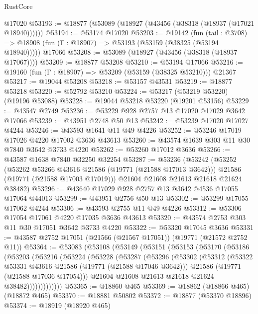 \begin{lexlean}{RustCore}
\begin{coremodule}
    @17020
@53193 := @18877 (@53089 (@18927 (@43456 (@38318 (@18937 (@17021 @18940))))))
@53194 := @53174 @17020
@53203 := @19142
    (fun (tail : @3708) => @18908 (fun (Γ : @18907) => @53193 (@53159 (@38325 (@53194 @18940)))))
    @17066
@53208 := @53089 (@18927 (@43456 (@38318 (@18937 @17067))))
@53209 := @18877 @53208
@53210 := @53194 @17066
@53216 := @19160 (fun (Γ : @18907) => @53209 (@53159 (@38325 @53210))) @21367
@53217 := @19044 @53208
@53218 := @53157 @43531
@53219 := @18877 @53218
@53220 := @52792 @53210
@53224 := @53217 (@53219 @53220) (@19196 @53088)
@53228 := @19044 @53218 @53220 (@19201 @53156)
@53229 := @43547 @2749
@53236 := @53229 @928 @2757 @13 @17020 @17029 @3642 @17066
@53239 := @43951 @2748 @50 @13
@53242 := @53239 @17020 @17027 @4244
@53246 := @43593 @1641 @11 @49 @4226
@53252 := @53246 @17019 @17026 @4220 @17002 @3636 @43613
@53260 := @43574 @1639 @303 @11 @30 @7840 @3642 @3733 @4220
@53262 := @53260 @17012 @3636
@53266 := @43587 @1638 @7840 @32250 @32254
@53287 := @53236
    (@53242
      (@53252
        (@53262 @53266 @43616 @21586 (@19771 (@21588 @17013 @3642)))
        @21586
        (@19771 (@21588 @17003 @17019)))
      @21604
      @21608
      @21613
      @21618
      @21624
      @38482)
@53296 := @43640 @17029 @928 @2757 @13 @3642 @4536 @17055 @17064 @44013
@53299 := @43951 @2756 @50 @13
@53302 := @53299 @17055 @17062 @4244
@53306 := @43593 @2755 @11 @49 @4226
@53312 := @53306 @17054 @17061 @4220 @17035 @3636 @43613
@53320 := @43574 @2753 @303 @11 @30 @17051 @3642 @3733 @4220
@53322 := @53320 @17045 @3636
@53331 := @43587 @2752 @17051 (@21566 (@21567 @17051)) (@19771 (@21572 @2752 @11))
@53364 := @53083
    (@53108
      (@53149
        (@53151
          (@53153
            (@53170
              (@53186
                (@53203
                  (@53216
                    (@53224
                      (@53228
                        (@53287
                          (@53296
                            (@53302
                              (@53312
                                (@53322 @53331 @43616 @21586 (@19771 (@21588 @17046 @3642)))
                                @21586
                                (@19771 (@21588 @17036 @17054)))
                              @21604
                              @21608
                              @21613
                              @21618
                              @21624
                              @38482)))))))))))))
@53365 := @18860 @465
@53369 := @18862 (@18866 @465) (@18872 @465)
@53370 := @18881 @50802
@53372 := @18877 (@53370 @18896)
@53374 := @18919 (@18920 @465)

\end{coremodule}
\end{lexlean}
